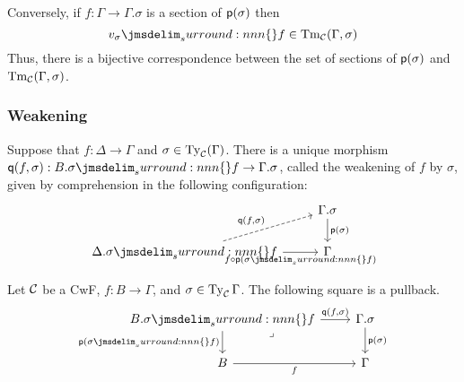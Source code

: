 \documentclass[a4paper]{article}
\begin{document}
Conversely, if $f : \Gamma \to \Gamma.\sigma$ is a section of $\operatorname{\mathsf{p}}(\sigma)$ then
\[
  \semSubst{v_{\sigma}}{f} \in \Tm{\cC}(\Gamma,\sigma)
\] 
Thus, there is a bijective correspondence between the set of sections of $\operatorname{\mathsf{p}}(\sigma)$ and $\operatorname{Tm}_{\mathcal{C}}(\Gamma,\sigma)$.

\subsubsection{Weakening}\label{sec:w}

Suppose that $f : \Delta \to \Gamma$ and $\sigma \in \operatorname{Ty}_{\mathcal{C}}(\Gamma)$.
There is a unique morphism $\ctxWkn(f,\sigma) : B.\semSubst{\sigma}{f} \to \Gamma.\sigma$, called the weakening of $f$ by $\sigma$, given by comprehension in the following configuration:
\[\begin{tikzcd}
    & {\Gamma.\sigma} \\
    {\Delta.\semSubst{\sigma}{f}} & \Gamma
    \arrow["{\ctxExt(\sigma)}", from=1-2, to=2-2]
    \arrow["{\ctxWkn(f,\sigma)}", dashed, from=2-1, to=1-2]
    \arrow["{f \circ \ctxExt(\semSubst{\sigma}{f})}"', from=2-1, to=2-2]
  \end{tikzcd}\]

\begin{proposition}
  Let $\mathcal{C}$ be a CwF, $f : B \to \Gamma$, and $\sigma \in \operatorname{Ty}_{\mathcal{C}}{\Gamma}$.
  The following square is a pullback.
  \[\begin{tikzcd}
      {B.\semSubst{\sigma}{f}} & {\Gamma.\sigma} \\
      B & \Gamma
      \arrow["{\ctxWkn(f,\sigma)}", from=1-1, to=1-2]
      \arrow["{\ctxExt(\semSubst{\sigma}{f})}"', from=1-1, to=2-1]
      \arrow["\lrcorner"{anchor=center, pos=0.125}, draw=none, from=1-1, to=2-2]
      \arrow["{\ctxExt(\sigma)}", from=1-2, to=2-2]
      \arrow["f"', from=2-1, to=2-2]
    \end{tikzcd}\]
\end{proposition}
\end{document}
